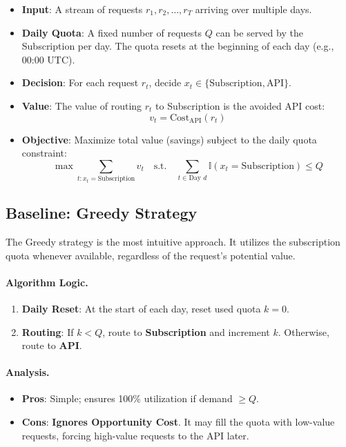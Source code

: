 \documentclass[11pt]{article}
\begin{document}
\begin{itemize}
  \item \textbf{Input}: A stream of requests $r_1, r_2, \dots, r_T$ arriving over multiple days.
  \item \textbf{Daily Quota}: A fixed number of requests $Q$ can be served by the Subscription per day. The quota resets at the beginning of each day (e.g., 00:00 UTC).
  \item \textbf{Decision}: For each request $r_t$, decide $x_t \in \{ \text{Subscription}, \text{API} \}$.
  \item \textbf{Value}: The value of routing $r_t$ to Subscription is the avoided API cost:
  \[ v_t = \text{Cost}_{\text{API}}(r_t) \]
  \item \textbf{Objective}: Maximize total value (savings) subject to the daily quota constraint:
  \[ \max \sum_{t: x_t = \text{Subscription}} v_t \quad \text{s.t.} \quad \sum_{t \in \text{Day } d} \mathbb{I}(x_t = \text{Subscription}) \le Q \]
\end{itemize}

\subsection{Baseline: Greedy Strategy}

The Greedy strategy is the most intuitive approach. It utilizes the subscription quota whenever available, regardless of the request's potential value.

\paragraph{Algorithm Logic.}
\begin{enumerate}
  \item \textbf{Daily Reset}: At the start of each day, reset used quota $k = 0$.
  \item \textbf{Routing}: If $k < Q$, route to \textbf{Subscription} and increment $k$. Otherwise, route to \textbf{API}.
\end{enumerate}

\paragraph{Analysis.}
\begin{itemize}
  \item \textbf{Pros}: Simple; ensures 100\% utilization if demand $\ge Q$.
  \item \textbf{Cons}: \textbf{Ignores Opportunity Cost}. It may fill the quota with low-value requests, forcing high-value requests to the API later.
\end{itemize}
\end{document}
